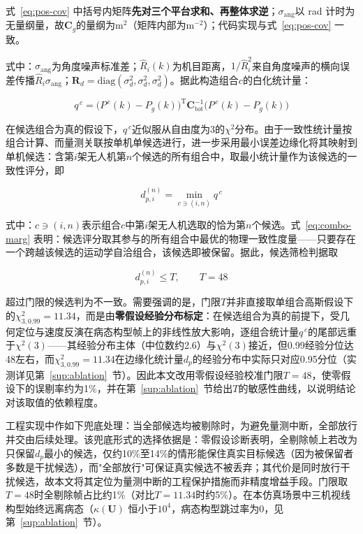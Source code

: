 \documentclass[UTF8,a4paper,zihao=-4]{ctexart}
\begin{document}
式~\eqref{eq:pos-cov} 中括号内矩阵\textbf{先对三个平台求和、再整体求逆}；\(\sigma_{\mathrm{ang}}\)以 rad 计时为无量纲量，故\(\boldsymbol{C}_g\)的量纲为\(\mathrm m^2\)（矩阵内部为\(\mathrm m^{-2}\)）；代码实现与式~\eqref{eq:pos-cov} 一致。

式中：\(\sigma_{\mathrm{ang}}\)为角度噪声标准差；\(\hat{R}_i(k)\)为机目距离，\(1/\hat{R}_i^2\)来自角度噪声的横向误差传播\(\hat{R}_i\sigma_{\mathrm{ang}}\)；\(\boldsymbol{R}_d=\mathrm{diag}(\sigma_d^2,\sigma_d^2,\sigma_d^2)\)。据此构造组合\(c\)的白化统计量：


\begin{equation}
q^{\,c}=\bigl(P^{\,c}(k)-P_g(k)\bigr)^{\mathrm T}\boldsymbol{C}_{\mathrm{tot}}^{-1}\bigl(P^{\,c}(k)-P_g(k)\bigr)
\label{eq:pos-chi2}
\end{equation}


在候选组合为真的假设下，\(q^{\,c}\)近似服从自由度为3的\(\chi^2\)分布。由于一致性统计量按组合计算、而量测关联按单机单候选进行，进一步采用最小误差边缘化将其映射到单机候选：含第\(i\)架无人机第\(n\)个候选的所有组合中，取最小统计量作为该候选的一致性评分，即


\begin{equation}
d_{p,i}^{(n)}=\min_{c\ni(i,n)}q^{\,c}
\label{eq:combo-marg}
\end{equation}


式中：\(c\ni(i,n)\)表示组合\(c\)中第\(i\)架无人机选取的恰为第\(n\)个候选。式~\eqref{eq:combo-marg} 表明：候选评分取其参与的所有组合中最优的物理一致性度量——只要存在一个跨越该候选的运动学自洽组合，该候选即被保留。据此，候选筛检判据取


\begin{equation}
d_{p,i}^{(n)}\le T,\qquad T=48
\label{eq:pos-threshold}
\end{equation}


超过门限的候选判为不一致。需要强调的是，门限\(T\)并非直接取单组合高斯假设下的\(\chi^2_{3,0.99}=11.34\)，而是由\textbf{零假设经验分布标定}：在候选组合为真的前提下，受几何定位与速度反演在病态构型帧上的非线性放大影响，逐组合统计量\(q^{\,c}\)的尾部远重于\(\chi^2(3)\)——其经验分布主体（中位数约2.6）与\(\chi^2(3)\)接近，但0.99经验分位达48左右，而\(\chi^2_{3,0.99}=11.34\)在边缘化统计量\(d_p\)的经验分布中实际只对应0.95分位（实测详见第~\ref{sup:ablation}~节）。因此本文改用零假设经验校准门限\(T=48\)，使零假设下的误剔率约为1\%，并在第~\ref{sup:ablation}~节给出\(T\)的敏感性曲线，以说明结论对该取值的依赖程度。

工程实现中作如下兜底处理：当全部候选均被剔除时，为避免量测中断，全部放行并交由后续处理。该兜底形式的选择依据是：零假设诊断表明，全剔除帧上若改为只保留\(d_p\)最小的候选，仅约10\%至14\%的情形能保住真实目标候选（因为被保留者多数是干扰候选），而"全部放行"可保证真实候选不被丢弃；其代价是同时放行干扰候选，故本文将其定位为量测中断的工程保护措施而非精度增益手段。门限取\(T=48\)时全剔除帧占比约1\%（对比\(T=11.34\)时约5\%）。在本仿真场景中三机视线构型始终远离病态（\(\kappa(\boldsymbol{U})\) 恒小于\(10^{4}\)，病态构型跳过率为0，见第~\ref{sup:ablation}~节）。
\end{document}
